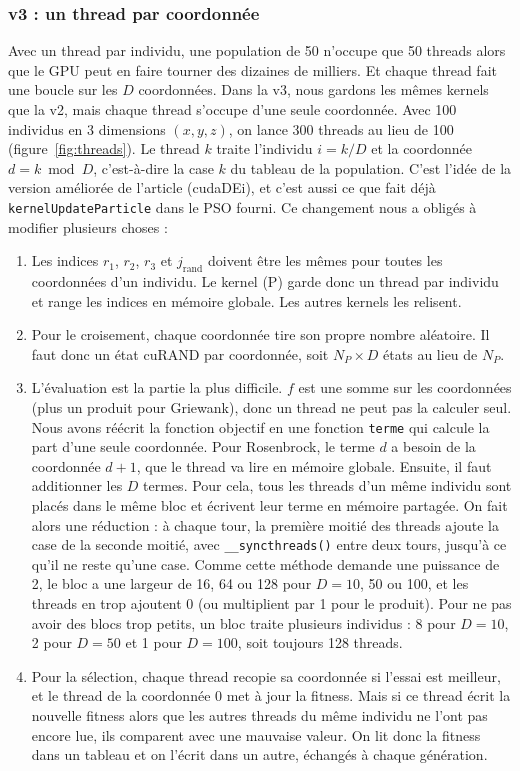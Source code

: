\documentclass[conference]{IEEEtran}
\begin{document}
\subsubsection{v3 : un thread par coordonn\'ee}
Avec un thread par individu, une population de 50 n'occupe que 50 threads alors que le GPU peut en faire tourner des dizaines de milliers. Et chaque thread fait une boucle sur les $D$ coordonn\'ees. Dans la v3, nous gardons les m\^emes kernels que la v2, mais chaque thread s'occupe d'une seule coordonn\'ee. Avec 100 individus en 3 dimensions $(x,y,z)$, on lance 300 threads au lieu de 100 (figure~\ref{fig:threads}). Le thread $k$ traite l'individu $i=k/D$ et la coordonn\'ee $d=k \bmod D$, c'est-\`a-dire la case $k$ du tableau de la population. C'est l'id\'ee de la version am\'elior\'ee de l'article (cudaDEi), et c'est aussi ce que fait d\'ej\`a \texttt{kernelUpdateParticle} dans le PSO fourni. Ce changement nous a oblig\'es \`a modifier plusieurs choses :
\begin{enumerate}
\item Les indices $r_1$, $r_2$, $r_3$ et $j_{\mathrm{rand}}$ doivent \^etre les m\^emes pour toutes les coordonn\'ees d'un individu. Le kernel (P) garde donc un thread par individu et range les indices en m\'emoire globale. Les autres kernels les relisent.
\item Pour le croisement, chaque coordonn\'ee tire son propre nombre al\'eatoire. Il faut donc un \'etat cuRAND par coordonn\'ee, soit $N_P\times D$ \'etats au lieu de $N_P$.
\item L'\'evaluation est la partie la plus difficile. $f$ est une somme sur les coordonn\'ees (plus un produit pour Griewank), donc un thread ne peut pas la calculer seul. Nous avons r\'e\'ecrit la fonction objectif en une fonction \texttt{terme} qui calcule la part d'une seule coordonn\'ee. Pour Rosenbrock, le terme $d$ a besoin de la coordonn\'ee $d+1$, que le thread va lire en m\'emoire globale. Ensuite, il faut additionner les $D$ termes. Pour cela, tous les threads d'un m\^eme individu sont plac\'es dans le m\^eme bloc et \'ecrivent leur terme en m\'emoire partag\'ee. On fait alors une r\'eduction : \`a chaque tour, la premi\`ere moiti\'e des threads ajoute la case de la seconde moiti\'e, avec \texttt{\_\_syncthreads()} entre deux tours, jusqu'\`a ce qu'il ne reste qu'une case. Comme cette m\'ethode demande une puissance de 2, le bloc a une largeur de 16, 64 ou 128 pour $D=10$, 50 ou 100, et les threads en trop ajoutent 0 (ou multiplient par 1 pour le produit). Pour ne pas avoir des blocs trop petits, un bloc traite plusieurs individus : 8 pour $D=10$, 2 pour $D=50$ et 1 pour $D=100$, soit toujours 128 threads.
\item Pour la s\'election, chaque thread recopie sa coordonn\'ee si l'essai est meilleur, et le thread de la coordonn\'ee 0 met \`a jour la fitness. Mais si ce thread \'ecrit la nouvelle fitness alors que les autres threads du m\^eme individu ne l'ont pas encore lue, ils comparent avec une mauvaise valeur. On lit donc la fitness dans un tableau et on l'\'ecrit dans un autre, \'echang\'es \`a chaque g\'en\'eration.
\end{enumerate}
\end{document}
